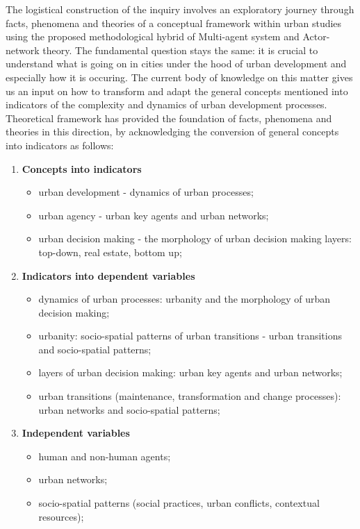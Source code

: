 \documentclass[11pt]{report}
\begin{document}
The logistical construction of the inquiry involves an exploratory journey through facts, phenomena and theories of a conceptual framework within urban studies using the proposed methodological hybrid of Multi-agent system and Actor-network theory. The fundamental question stays the same: it is crucial to understand what is going on in cities under the hood of urban development and especially how it is occuring.
The current body of knowledge on this matter gives us an input on how to transform and adapt the general concepts mentioned into indicators of the complexity and dynamics of urban development processes. Theoretical framework has provided the foundation of facts, phenomena and theories in this direction, by acknowledging the conversion of general concepts into indicators as follows:
\begin{enumerate}
\item \textbf{Concepts into indicators}
\begin{itemize}
\item urban development - dynamics of urban processes;
\item urban agency - urban key agents and urban networks;
\item urban decision making - the morphology of urban decision making layers: top-down, real estate, bottom up;
\end{itemize}
\item \textbf{Indicators into dependent variables}
\begin{itemize}
\item dynamics of urban processes: urbanity and the morphology of urban decision making;
\item urbanity: socio-spatial patterns of urban transitions - urban transitions and socio-spatial patterns;
\item layers of urban decision making: urban key agents and urban networks;
\item urban transitions (maintenance, transformation and change processes): urban networks and socio-spatial patterns;
\end{itemize}
\item \textbf{Independent variables}
\begin{itemize}
\item human and non-human agents;
\item urban networks;
\item socio-spatial patterns (social practices, urban conflicts, contextual resources);
\end{itemize}
\end{enumerate}
\end{document}
